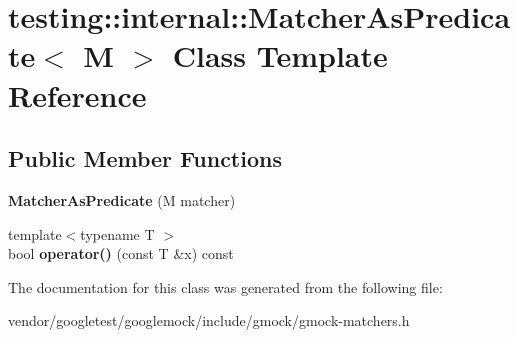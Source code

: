 \hypertarget{classtesting_1_1internal_1_1MatcherAsPredicate}{}\section{testing\+:\+:internal\+:\+:Matcher\+As\+Predicate$<$ M $>$ Class Template Reference}
\label{classtesting_1_1internal_1_1MatcherAsPredicate}
\subsection*{Public Member Functions}
\begin{DoxyCompactItemize}
\item 
{\bfseries Matcher\+As\+Predicate} (M matcher)\hypertarget{classtesting_1_1internal_1_1MatcherAsPredicate_a2d8ad258929496dd3dea00fdb8ce3c8a}{}\label{classtesting_1_1internal_1_1MatcherAsPredicate_a2d8ad258929496dd3dea00fdb8ce3c8a}

\item 
{\footnotesize template$<$typename T $>$ }\\bool {\bfseries operator()} (const T \&x) const \hypertarget{classtesting_1_1internal_1_1MatcherAsPredicate_ac6347406b1d2cc241a7f1b86e2bfc922}{}\label{classtesting_1_1internal_1_1MatcherAsPredicate_ac6347406b1d2cc241a7f1b86e2bfc922}

\end{DoxyCompactItemize}


The documentation for this class was generated from the following file\+:\begin{DoxyCompactItemize}
\item 
vendor/googletest/googlemock/include/gmock/gmock-\/matchers.\+h\end{DoxyCompactItemize}
